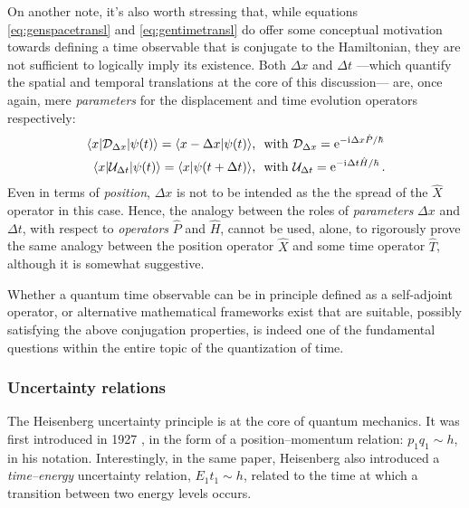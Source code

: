 On another note, it's also worth stressing that,
while equations \eqref{eq:genspacetransl} and \eqref{eq:gentimetransl}
do offer some conceptual motivation towards defining a time observable that is conjugate to the Hamiltonian,
they are not sufficient to logically imply its existence.
Both $\Delta{x}$ and $\Delta{t}$ ---which quantify the spatial and temporal translations at the core of this discussion---
are, once again, mere \emph{parameters} for the displacement and time evolution operators respectively:
\begin{align}
  \mel{x}{\mathcal{D}_{\Delta{x}}}{\psi(t)}        = \braket{x-\Delta{x}}{\psi(t)}\!\text{, }
    &\text{ with } \mathcal{D}_{\Delta{x}}    = \mathrm{e}^{-\mathrm{i}\mkern1mu \Delta x \hat{P} / \hbar} \\
  \mel{x}{\mathcal{U}_{\Delta{t}}}{\psi(t)}        = \braket{x}{\psi(t+\Delta{t})}\!\text{, }
    &\text{ with } \mathcal{U}_{\Delta{t}}    = \mathrm{e}^{-\mathrm{i}\mkern1mu \Delta t \hat{H} / \hbar}
  \, \text{.}
\end{align}
Even in terms of \emph{position},
$\Delta x$ is not to be intended as the the spread of the $\hat{X}$ operator in this case.
Hence, the analogy between the roles of \emph{parameters} $\Delta x$ and $\Delta t$,
with respect to \emph{operators} $\hat{P}$ and $\hat{H}$,
cannot be used, alone, to rigorously prove the same analogy between the position operator $\hat{X}$
and some time operator $\hat{T}$, although it is somewhat suggestive.

Whether a quantum time observable can be in principle defined as a self-adjoint
operator, or alternative mathematical frameworks exist that are suitable,
possibly satisfying the above conjugation properties,
is indeed one of the fundamental questions within the entire topic
of the quantization of time.

\subsubsection{Uncertainty relations}

The Heisenberg uncertainty principle is at the core of quantum mechanics.
It was first introduced in 1927 \parencite{Heisenberg:Uncertainty},
in the form of a position--momentum relation: $p_{1}q_{1} \sim h$, in his notation.
Interestingly, in the same paper, Heisenberg also introduced
a \emph{time--energy} uncertainty relation, $E_{1}t_{1} \sim h$,
related to the time at which a transition between two energy levels occurs.

